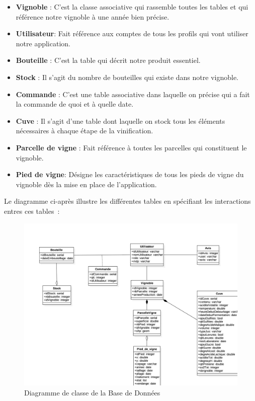 \documentclass[a4paper, title]{report}
\providecommand{\tightlist}{%
  \setlength{\itemsep}{0pt}\setlength{\parskip}{0pt}}
\begin{document}
\begin{itemize}
\tightlist
\item
  \textbf{Vignoble} : C'est la classe associative qui rassemble toutes les tables et qui référence notre vignoble à une année bien précise.
\item
  \textbf{Utilisateur}: Fait référence aux comptes de tous les profils qui vont
  utiliser notre application.
\item
  \textbf{Bouteille} : C'est la table qui décrit notre produit essentiel. 
\item  
  \textbf{Stock} : Il s'agit du nombre de bouteilles qui existe dans notre vignoble.
\item
  \textbf{Commande} : C'est une table associative dans laquelle on précise qui a fait la commande de quoi et à quelle date.
\item
  \textbf{Cuve} : Il s'agit d'une table dont laquelle on stock tous les éléments nécessaires à chaque étape de la vinification.
\item
  \textbf{Parcelle de vigne} : Fait référence à toutes les parcelles qui
  constituent le vignoble.
\item
  \textbf{Pied de vigne}: Désigne les caractéristiques de tous les pieds de
  vigne du vignoble dès la mise en place de l'application.
\end{itemize}

Le diagramme ci-après illustre les différentes tables en spécifiant les
interactions entres ces tables~:

\begin{figure}
\centering
\includegraphics{Images/DiagrammeClasseBDD.jpg}
\caption{Diagramme de classe de la Base de Données}
\end{figure}
\end{document}
